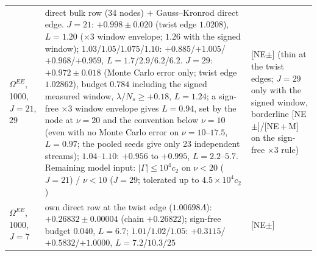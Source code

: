 \documentclass[aps,prl,onecolumn,superscriptaddress,nofootinbib]{revtex4-2}
\begin{document}
\begin{table}[!htbp]
\begin{ruledtabular}
\begin{tabular}{L{3.0cm}L{10.8cm}L{2.4cm}}
$\Omega^{EE}$, 1000, $J=21$, $29$ & direct bulk row (34 nodes) $+$ Gauss--Kronrod direct edge. $J=21$: $+0.998\pm0.020$ (twist edge $1.0208$), $L=1.20$ ($\times3$ window envelope; $1.26$ with the signed window); $1.03$/$1.05$/$1.075$/$1.10$: $+0.885$/$+1.005$/$+0.968$/$+0.959$, $L=1.7$/$2.9$/$6.2$/$6.2$. $J=29$: $+0.972\pm0.018$ (Monte Carlo error only; twist edge $1.02862$), budget $0.784$ including the signed measured window, $\lambda/N_s\ge+0.18$, $L=1.24$; a sign-free $\times3$ window envelope gives $L=0.94$, set by the node at $\nu=20$ and the convention below $\nu=10$ (even with no Monte Carlo error on $\nu=10$--$17.5$, $L=0.97$; the pooled seeds give only 23 independent streams); $1.04$--$1.10$: $+0.956$ to $+0.995$, $L=2.2$--$5.7$. Remaining model input: $|\Gamma|\le10^4c_2$ on $\nu<20$ ($J=21$) / $\nu<10$ ($J=29$; tolerated up to $4.5\times10^4c_2$) & [NE$\pm$] (thin at the twist edges; $J=29$ only with the signed window, borderline [NE$\pm$]/[NE\,+\,M] on the sign-free $\times3$ rule)\\
$\Omega^{EE}$, 1000, $J=7$ & own direct row at the twist edge ($1.00698\Lambda$): $+0.26832\pm0.00004$ (chain $+0.26822$); sign-free budget $0.040$, $L=6.7$; $1.01$/$1.02$/$1.05$: $+0.3115$/$+0.5832$/$+1.0000$, $L=7.2$/$10.3$/$25$ & [NE$\pm$]\\
\end{tabular}
\end{ruledtabular}
\end{table}
\end{document}
